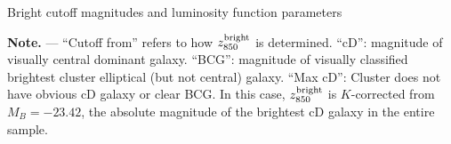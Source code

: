 \begin{table}[t]
\begin{center}
\caption{\label{tab:lum_params} Bright cutoff magnitudes 
and luminosity function parameters}
\vspace{10pt}

\end{center}
{\footnotesize 
{\bf Note.} --- ``Cutoff from'' refers to how $z_{850}^{\rm bright}$ is
determined.  ``cD'': magnitude of visually central dominant
galaxy. ``BCG'': magnitude of visually classified brightest cluster
elliptical (but not central) galaxy. ``Max cD'': Cluster does not have
obvious cD galaxy or clear BCG. In this case, $z_{850}^{\rm bright}$
is $K$-corrected from $M_B = -23.42$, the absolute magnitude of the
brightest cD galaxy in the entire sample.}
\end{table}

